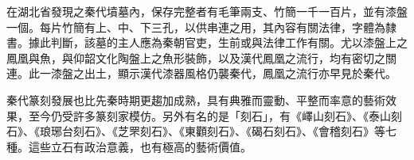 在湖北省發現之秦代墳墓內，保存完整者有毛筆兩支、竹簡一千一百片，並有漆盤一個。每片竹簡有上、中、下三孔，以供串連之用，其內容有關法律，字體為隸書。據此判斷，該墓的主人應為秦朝官吏，生前或與法律工作有關。尤以漆盤上之鳳凰與魚，與仰韶文化陶盤上之魚形裝飾，以及漢代鳳凰之流行，均有密切之關連。此一漆盤之出土，顯示漢代漆器風格仍襲秦代，鳳凰之流行亦早見於秦代。

秦代篆刻發展也比先秦時期更趨加成熟，具有典雅而靈動、平整而率意的藝術效果，至今仍受許多篆刻家模仿。另外有名的是「刻石」，有《嶧山刻石》、《泰山刻石》、《琅琊台刻石》、《芝罘刻石》、《東顴刻石》、《碣石刻石》、《會稽刻石》等七種。這些立石有政治意義，也有極高的藝術價值。







